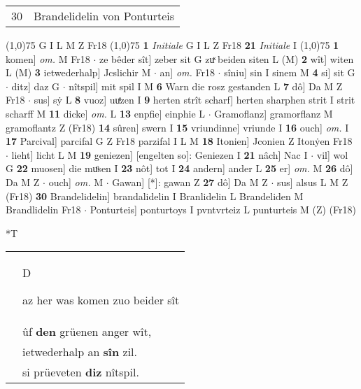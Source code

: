 \documentclass[8pt,a4paper,notitlepage]{article}
\begin{document}
\begin{table}[ht]
\begin{minipage}[t]{0.5\linewidth}
\begin{tabular}{rl}
30 & Brandelidelin von Ponturteis\\ 
\end{tabular}
\scriptsize
\line(1,0){75} \newline
G I L M Z Fr18 \newline
\line(1,0){75} \newline
\textbf{1} \textit{Initiale} G I L Z Fr18  \textbf{21} \textit{Initiale} I  \newline
\line(1,0){75} \newline
\textbf{1} komen] \textit{om.} M Fr18  $\cdot$ ze bêder sît] zeber sit G zuͯ beiden siten L (M) \textbf{2} wît] witen L (M) \textbf{3} ietwederhalp] Jcslichir M  $\cdot$ an] \textit{om.} Fr18  $\cdot$ sîniu] sin I sinem M \textbf{4} si] sit G  $\cdot$ ditz] daz G  $\cdot$ nîtspil] mit spil I M \textbf{6} Warn die rosz gestanden L \textbf{7} dô] Da M Z Fr18  $\cdot$ sus] sẏ L \textbf{8} vuoz] uuͤzen I \textbf{9} herten strît scharf] herten sharphen strit I strit scharff M \textbf{11} dicke] \textit{om.} L \textbf{13} enpfie] einphie L  $\cdot$ Gramoflanz] gramorflanz M gramoflantz Z (Fr18) \textbf{14} sûren] swern I \textbf{15} vriundinne] vriunde I \textbf{16} ouch] \textit{om.} I \textbf{17} Parcival] parcifal G Z Fr18 parzifal I L M \textbf{18} Itonien] Jconien Z Itonẏen Fr18  $\cdot$ lieht] licht L M \textbf{19} geniezen] [engelten so]: Geniezen I \textbf{21} nâch] Nac I  $\cdot$ vil] wol G \textbf{22} muosen] die muͦsen I \textbf{23} nôt] tot I \textbf{24} andern] ander L \textbf{25} er] \textit{om.} M \textbf{26} dô] Da M Z  $\cdot$ ouch] \textit{om.} M  $\cdot$ Gawan] [*]: gawan Z \textbf{27} dô] Da M Z  $\cdot$ sus] alsus L M Z (Fr18) \textbf{30} Brandelidelin] brandalidelin I Branlidelin L Brandeliden M Brandlidelin Fr18  $\cdot$ Ponturteis] ponturtoys I pvntvrteiz L punturteis M (Z) (Fr18) \newline
\end{minipage}
\hspace{0.5cm}
\begin{minipage}[t]{0.5\linewidth}
\small
\begin{center}*T
\end{center}
\begin{tabular}{rl}
 & \begin{large}D\end{large}az her was komen zuo beider sît\\ 
 & ûf \textbf{den} grüenen anger wît,\\ 
 & ietwederhalp an \textbf{sîn} zil.\\ 
 & si prüeveten \textbf{diz} nîtspil.\\ 

\end{tabular}
\end{minipage}
\end{table}
\end{document}
